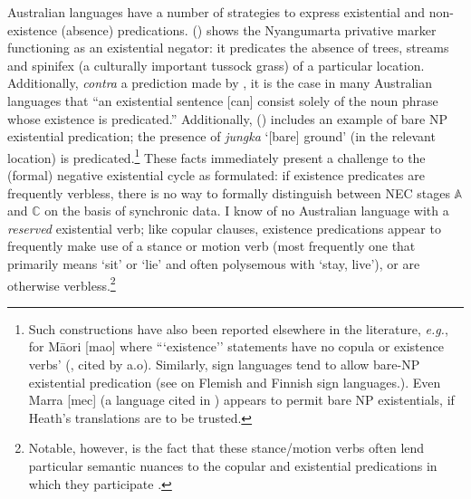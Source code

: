Australian languages have a number of strategies to express existential and non-exis\-tence (absence) predications. () shows the Nyangumarta privative marker functioning as an existential negator: it predicates the absence of trees, streams and spinifex (a culturally important tussock grass) of a particular location. Additionally, \textit{contra} a prediction made by \citet[19]{Croft1991}, it is the case in many Australian languages that ``an existential sentence [can] consist solely of the noun phrase whose existence is predicated.'' Additionally, () includes an example of bare NP existential predication; the presence of \textit{jungka} `[bare] ground' (in the relevant location) is predicated.\footnote{Such constructions have also been reported elsewhere in the literature, \textit{e.g.}, for Māori [\gls{mao}] where ```existence'' statements have no copula or existence verbs' (\citealp[78]{Bauer1993}, cited by \citealp{Chung2004} a.o). Similarly, sign languages tend to allow bare-NP existential predication (see \citealt[26ff]{deWeert2016} on Flemish and Finnish sign languages.). Even Marra [\gls{mec}] (a language cited in \citealt[14]{Croft1991}) appears to permit bare NP existentials, if Heath's \citeyearpar[364]{Heath1981} translations are to be trusted.}
 These facts immediately present a challenge to the (formal) negative existential cycle as formulated: if existence predicates are frequently verbless, there is no way to formally distinguish between NEC stages $ \boldsymbol{\mathbb{A}} $ and $ \boldsymbol{\mathbb{C}} $ on the basis of synchronic data. I know of no Australian language with a \textit{reserved} existential verb; like copular clauses, existence predications appear to frequently make use of a stance or motion verb (most frequently one that primarily means `sit' or `lie' and often polysemous with `stay, live'), or are otherwise verbless.\footnote{Notable, however, is the fact that these stance/motion verbs often lend particular semantic nuances to the copular and existential predications in which they participate \citep[see e.g. ][610-611]{Wilkinson1991}.}


